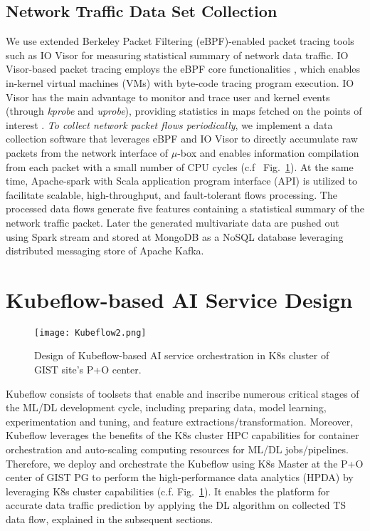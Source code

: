 \documentclass[10pt, conference]{IEEEtran}
\begin{document}
\subsection{Network Traffic Data Set Collection}
\label{sec:dataset}
We use extended Berkeley Packet Filtering (eBPF)-enabled packet tracing tools such as IO Visor for measuring statistical summary of network data traffic. IO Visor-based packet tracing employs the eBPF core functionalities \cite{rathore2017comparing}, which enables in-kernel virtual machines (VMs) with byte-code tracing program execution. IO Visor has the main advantage to monitor and trace user and kernel events (through \textit{kprobe} and \textit{uprobe}), providing statistics in maps fetched on the points of interest \cite{gregg2016linux}. 
\textit{To collect network packet flows periodically}, we implement a data collection software that leverages eBPF and IO Visor to directly accumulate raw packets from the network interface of $\mu$-box and enables information compilation from each packet with a small number of CPU cycles (c.f~ Fig.~\ref{fig:AIservice}). At the same time, Apache-spark with Scala application program interface (API) is utilized to facilitate scalable, high-throughput, and fault-tolerant flows processing. The processed data flows generate five features containing a statistical summary of the network traffic packet. Later the generated multivariate data are pushed out using Spark stream and stored at MongoDB as a NoSQL database leveraging distributed messaging store of Apache Kafka.

\section{Kubeflow-based AI Service Design}
\label{sec:performance}
\begin{figure}
\centering
\texttt{[image: Kubeflow2.png]}
	\caption{Design of Kubeflow-based AI service orchestration in K8s cluster of GIST site's P+O center.}
	\label{fig:AIservice}
	\vspace{-10pt}
\end{figure}
Kubeflow consists of toolsets that enable and inscribe numerous critical stages of the ML/DL development cycle, including preparing data, model learning, experimentation and tuning, and feature extractions/transformation. Moreover, Kubeflow leverages the benefits of the K8s cluster HPC capabilities for container orchestration and auto-scaling computing resources for ML/DL jobs/pipelines. Therefore, we deploy and orchestrate the Kubeflow using K8s Master at the P+O center of GIST PG to perform the high-performance data analytics (HPDA) by leveraging K8s cluster capabilities (c.f. Fig.~\ref{fig:AIservice}). It enables the platform for accurate data traffic prediction by applying the DL algorithm on collected TS data flow, explained in the subsequent sections. 
\end{document}
